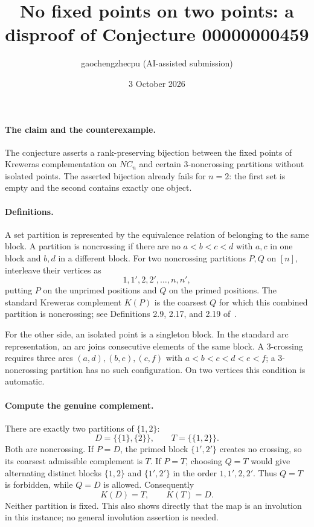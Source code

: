 \documentclass[11pt]{article}
\title{No fixed points on two points: a disproof of Conjecture 00000000459}
\author{gaochengzhecpu (AI-assisted submission)}
\date{3 October 2026}
\begin{document}
\maketitle

\paragraph{The claim and the counterexample.}
The conjecture asserts a rank-preserving bijection between the fixed points
of Kreweras complementation on $NC_n$ and certain 3-noncrossing partitions
without isolated points. The asserted bijection already fails for $n=2$:
the first set is empty and the second contains exactly one object.

\paragraph{Definitions.}
A set partition is represented by the equivalence relation of belonging
to the same block. A partition is noncrossing if there are no
$a<b<c<d$ with $a,c$ in one block and $b,d$ in a different block.
For two noncrossing partitions $P,Q$ on $[n]$, interleave their vertices as
\[
 1,1',2,2',\ldots,n,n',
\]
putting $P$ on the unprimed positions and $Q$ on the primed positions.
The standard Kreweras complement $K(P)$ is the coarsest $Q$ for which
this combined partition is noncrossing; see Definitions 2.9, 2.17,
and 2.19 of~\cite{kreweras}.

For the other side, an isolated point is a singleton block.
In the standard arc representation, an arc joins consecutive elements
of the same block. A 3-crossing requires three arcs $(a,d),(b,e),(c,f)$
with $a<b<c<d<e<f$; a 3-noncrossing partition has no such configuration.
On two vertices this condition is automatic.

\paragraph{Compute the genuine complement.}
There are exactly two partitions of $\{1,2\}$:
\[
 D=\{\{1\},\{2\}\},\qquad T=\{\{1,2\}\}.
\]
Both are noncrossing. If $P=D$, the primed block $\{1',2'\}$ creates
no crossing, so its coarsest admissible complement is $T$.
If $P=T$, choosing $Q=T$ would give alternating distinct blocks
$\{1,2\}$ and $\{1',2'\}$ in the order $1,1',2,2'$.
Thus $Q=T$ is forbidden, while $Q=D$ is allowed. Consequently
\[
 K(D)=T,\qquad K(T)=D.
\]
Neither partition is fixed. This also shows directly that the map is
an involution in this instance; no general involution assertion is needed.
\end{document}

